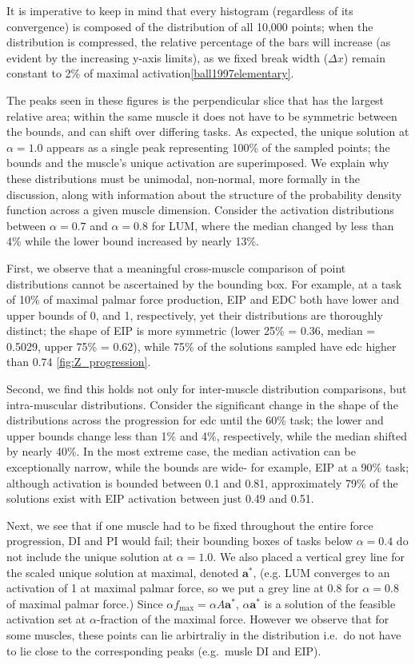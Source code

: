 It is imperative to keep in mind that every histogram (regardless of its convergence) is composed of the distribution of all 10,000 points; when the distribution is compressed, the relative percentage of the bars will increase (as evident by the increasing y-axis limits), as we fixed break width ($\Delta x$) remain constant to 2\% of maximal activation\ref{ball1997elementary}.

The peaks seen in these figures is the perpendicular slice that has the largest relative area; within the same muscle it does not have to be symmetric between the bounds, and can shift over differing tasks.
As expected, the unique solution at $\alpha=1.0$ appears as a single peak representing 100\% of the sampled points; the bounds and the muscle's unique activation are superimposed.
We explain why these distributions must be unimodal, non-normal, more formally in the discussion, along with information about the structure of the probability density function across a given muscle dimension.
Consider the activation distributions between $\alpha = 0.7$ and $\alpha = 0.8$ for LUM, where the median changed by less than 4\% while the lower bound increased by nearly 13\%.

First, we observe that a meaningful cross-muscle comparison of point distributions cannot be ascertained by the bounding box. For example, at a task of 10\% of maximal palmar force production, EIP and EDC both have lower and upper bounds of 0, and 1, respectively, yet their distributions are thoroughly distinct; the shape of EIP is more symmetric (lower 25\% = 0.36, median = 0.5029, upper 75\% = 0.62), while 75\% of the solutions sampled have edc higher than 0.74 \ref{fig:Z_progression}.

Second, we find this holds not only for inter-muscle distribution comparisons, but intra-muscular distributions. Consider the significant change in the shape of the distributions across the progression for edc until the 60\% task; the lower and upper bounds change less than 1\% and 4\%, respectively, while the median shifted by nearly 40\%.
In the most extreme case, the median activation can be exceptionally narrow, while the bounds are wide- for example, EIP at a 90\% task; although activation is bounded between 0.1 and 0.81, approximately 79\% of the solutions exist with EIP activation between just 0.49 and 0.51.

Next, we see that if one muscle had to be fixed throughout the entire force progression, DI and PI would fail; their bounding boxes of tasks below $\alpha=0.4$ do not include the unique solution at $\alpha=1.0$. We also placed a vertical grey line for the scaled unique solution at maximal, denoted $\textbf{a}^*$, (e.g. LUM converges to an activation of 1 at maximal palmar force, so we put a grey line at 0.8 for $\alpha=0.8$ of maximal palmar force.) Since $\alpha f_{\max} = \alpha A \textbf{a}^*$, $\alpha \textbf{a}^*$ is a solution of the feasible activation set at $\alpha$-fraction of the maximal force. However we observe that for some muscles, these points can lie arbirtraliy in the distribution i.e.\ do not have to lie close to the corresponding peaks (e.g.\ musle DI and EIP).

